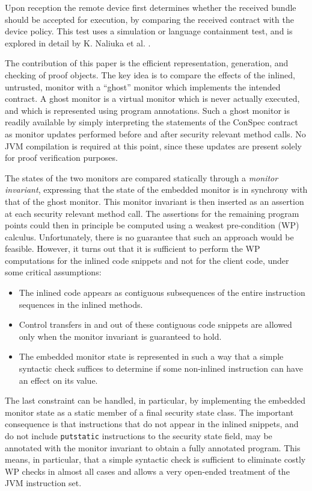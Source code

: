 \documentclass[10pt,twocolumn]{article}
\begin{document}
Upon reception the remote device first determines whe\-ther the received
bundle should be accepted for execution, by comparing the received
contract with the device policy. This test uses a simulation or language 
containment test, and is explored in detail by K. Naliuka et al. \cite{Bielova2009340}. 

The contribution of this paper is the efficient representation, generation, 
and checking of proof objects. The key idea is to compare the 
effects of the inlined, untrusted, monitor with a ``ghost''  monitor
which implements the intended contract. A ghost monitor is 
a virtual monitor which is never actually executed, and which is represented
using program annotations.
Such a ghost monitor is readily available by simply interpreting the 
statements of the ConSpec contract as monitor updates performed before 
and after security relevant method calls. No JVM compilation is required 
at this point, since these updates are present solely for proof 
verification purposes.

The states of the two monitors are compared statically through a 
{\em monitor invariant}, expressing that the state of the embedded 
monitor is in synchrony with that of the ghost monitor. This monitor 
invariant is then inserted as an assertion at each security relevant method call. The assertions for the remaining program points could then in principle 
be computed using a weakest pre-condition (WP) calculus. Unfortunately, 
there is no guarantee that such an approach would be feasible. 
However, it turns out that it is sufficient to perform the WP computations 
for the inlined code snippets and not for the client code, under some 
critical assumptions:
\begin{itemize}
\item The inlined code appears as contiguous subsequences of the entire 
instruction sequences in the inlined methods.
\item Control transfers in and out of these contiguous code snippets are allowed 
only when the monitor invariant is guaranteed to hold.
\item The embedded monitor state is represented in such a way that a 
simple syntactic check suffices to determine if some non-inlined 
instruction can have an effect on its value.
\end{itemize}
The last constraint can be handled, in particular, by implementing the 
embedded monitor state as a static member of a final security state class. 
The important consequence is that instructions that do not appear in 
the inlined snippets, and do not include {\tt putstatic} instructions to 
the security state field, may  be annotated with the monitor invariant 
to obtain a fully annotated program. This means, in particular, that a simple 
syntactic check is sufficient to eliminate costly WP checks in almost all 
cases and allows a very open-ended treatment of the JVM instruction set. 
\end{document}
